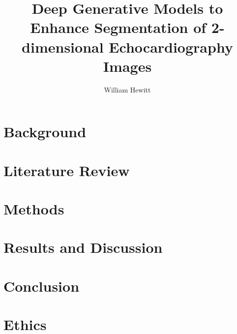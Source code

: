 \documentclass[titlepage]{article}
\begin{document}
    

\title{Deep Generative Models to Enhance Segmentation of 2-dimensional Echocardiography Images}
\author{William Hewitt}
\maketitle

\section{Background}


\section{Literature Review}


\section{Methods}


\section{Results and Discussion}


\section{Conclusion}


\section{Ethics}

\end{document}
